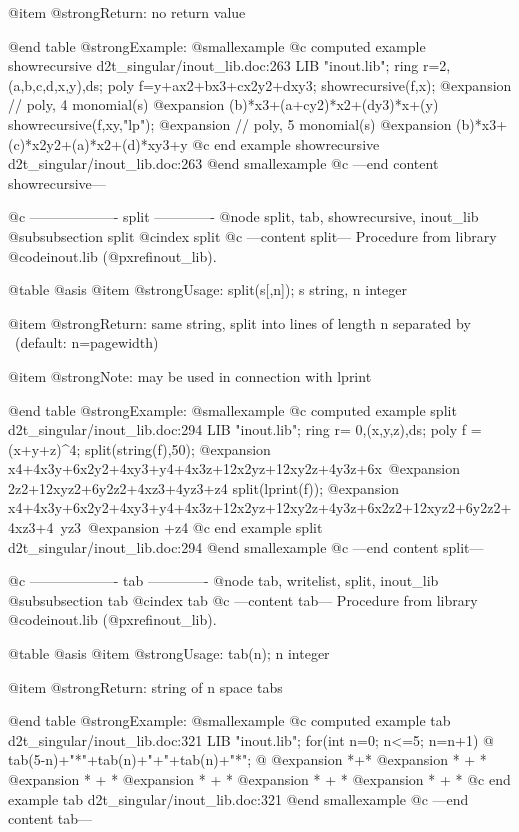 @item @strong{Return:}
no return value

@end table
@strong{Example:}
@smallexample
@c computed example showrecursive d2t_singular/inout_lib.doc:263 
LIB "inout.lib";
ring r=2,(a,b,c,d,x,y),ds;
poly f=y+ax2+bx3+cx2y2+dxy3;
showrecursive(f,x);
@expansion{} // poly, 4 monomial(s)
@expansion{} (b)*x3+(a+cy2)*x2+(dy3)*x+(y)
showrecursive(f,xy,"lp");
@expansion{} // poly, 5 monomial(s)
@expansion{} (b)*x3+(c)*x2y2+(a)*x2+(d)*xy3+y
@c end example showrecursive d2t_singular/inout_lib.doc:263
@end smallexample
@c ---end content showrecursive---

@c ------------------- split -------------
@node split, tab, showrecursive, inout_lib
@subsubsection split
@cindex split
@c ---content split---
Procedure from library @code{inout.lib} (@pxref{inout_lib}).

@table @asis
@item @strong{Usage:}
split(s[,n]); s string, n integer

@item @strong{Return:}
same string, split into lines of length n separated by \
(default: n=pagewidth)

@item @strong{Note:}
may be used in connection with lprint

@end table
@strong{Example:}
@smallexample
@c computed example split d2t_singular/inout_lib.doc:294 
LIB "inout.lib";
ring r= 0,(x,y,z),ds;
poly f = (x+y+z)^4;
split(string(f),50);
@expansion{} x4+4x3y+6x2y2+4xy3+y4+4x3z+12x2yz+12xy2z+4y3z+6x\
@expansion{} 2z2+12xyz2+6y2z2+4xz3+4yz3+z4
split(lprint(f));
@expansion{}   x4+4x3y+6x2y2+4xy3+y4+4x3z+12x2yz+12xy2z+4y3z+6x2z2+12xyz2+6y2z2+4xz3+4\
   yz3\
@expansion{} +z4
@c end example split d2t_singular/inout_lib.doc:294
@end smallexample
@c ---end content split---

@c ------------------- tab -------------
@node tab, writelist, split, inout_lib
@subsubsection tab
@cindex tab
@c ---content tab---
Procedure from library @code{inout.lib} (@pxref{inout_lib}).

@table @asis
@item @strong{Usage:}
tab(n); n integer

@item @strong{Return:}
string of n space tabs

@end table
@strong{Example:}
@smallexample
@c computed example tab d2t_singular/inout_lib.doc:321 
LIB "inout.lib";
for(int n=0; n<=5; n=n+1)
@{ tab(5-n)+"*"+tab(n)+"+"+tab(n)+"*"; @}
@expansion{}      *+*
@expansion{}     * + *
@expansion{}    *  +  *
@expansion{}   *   +   *
@expansion{}  *    +    *
@expansion{} *     +     *
@c end example tab d2t_singular/inout_lib.doc:321
@end smallexample
@c ---end content tab---

